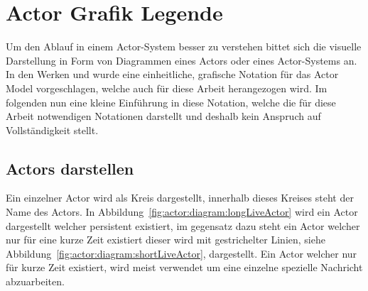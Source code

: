 \section{Actor Grafik Legende}\label{actor:diagram:description}
Um den Ablauf in einem Actor-System besser zu verstehen bittet sich die visuelle Darstellung in Form von Diagrammen eines Actors oder eines Actor-Systems an. In den Werken \cite{kuhn2017reactive} und \cite{Vernon2015ReactiveAkka} wurde eine einheitliche, grafische Notation für das Actor Model vorgeschlagen, welche auch für diese Arbeit herangezogen wird. Im folgenden nun eine kleine Einführung in diese Notation, welche die für diese Arbeit notwendigen Notationen darstellt und deshalb kein Anspruch auf Vollständigkeit stellt.\\
\subsection{Actors darstellen}
Ein einzelner Actor wird als Kreis dargestellt, innerhalb dieses Kreises steht der Name des Actors. In Abbildung~\ref{fig:actor:diagram:longLiveActor} wird ein Actor dargestellt welcher persistent existiert, im gegensatz dazu steht ein Actor welcher nur für eine kurze Zeit existiert dieser wird mit gestrichelter Linien, siehe Abbildung~\ref{fig:actor:diagram:shortLiveActor}, dargestellt. Ein Actor welcher nur für kurze Zeit existiert, wird meist verwendet um eine einzelne spezielle Nachricht abzuarbeiten.
